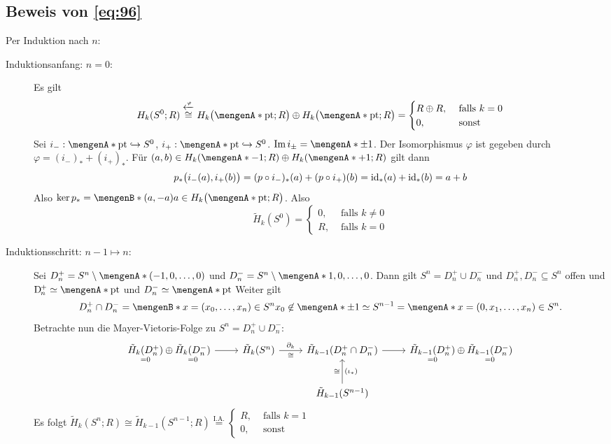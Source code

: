 \subsection[Beweis von \textbf{[\#\#]}]{Beweis von \eqref{eq:96}} %
\label{sub:97}
Per Induktion nach $n$:
\begin{description}
	\item[Induktionsanfang: $n=0$:] Es gilt
	\begin{align*}
		H_k(S^0;R) \stackrel{\xleftarrow{\varphi}}{\cong} H_k \enbrace[\big]{\set{\mathrm{pt}};R } \oplus H_k \enbrace[\big]{\set{\mathrm{pt}};R } = \begin{cases}
			R \oplus R, &\text{ falls }k=0\\
			0 ,&\text{ sonst}
		\end{cases}
	\end{align*} 
	Sei $i_- : \set{\mathrm{pt}} \hookrightarrow S^0$, $i_+ : \set{\mathrm{pt}} \hookrightarrow S^0$. $\im i_{\pm} = \set{\pm 1}$.
	Der Isomorphismus $\varphi$ ist gegeben durch $\varphi = (i_-)_* + (i_+)_*$. Für
	$(a,b) \in H_k \enbrace*{\set{-1};R}\oplus H_k \enbrace*{\set{+1};R}$ gilt dann
	\[
		p_* \enbrace[\big]{i_-(a), i_+(b)} = (p \circ i_-)_*(a) + (p \circ i_+)(b) = \id_*(a) + \id_*(b)= a+b
	\]
	Also $\ker p_* = \set[(a,-a)]{a \in H_k \enbrace[\big]{\set{\mathrm{pt}};R}}$. Also 
	\[
		\tilde{H}_k(S^0) = \begin{cases}
			0, &\text{ falls }k \not= 0\\
			R ,&\text{ falls }k=0
		\end{cases}
	\]
	\item[Induktionsschritt: $n-1  \mapsto n$:] Sei $D_n^+ = S^n \setminus \set{(-1,0,\ldots ,0)}$ und $D_n^- = S^n \setminus \set{1,0,\ldots ,0}$. Dann gilt
	$S^n = D_n^+ \cup D_n^-$ und $D_n^+, D_n^- \subseteq S^n$ offen und $\D_n^+ \simeq \set{\mathrm{pt}}$ und $D_n^- \simeq \set{\mathrm{pt}}$
	Weiter gilt 
	\[
		D_n^+ \cap D_n^- = \set[x=(x_0, \ldots , x_n) \in S^n]{x_0 \not\in \set{\pm 1}} \simeq S^{n-1} = \set{x=(0, x_1, \ldots , x_n) \in S^n}.
	\]
	Betrachte nun die Mayer-Vietoris-Folge zu $S^n = D_n^+ \cup D_n^-$: 
	\[
		\begin{tikzcd}
			\underset{=0}{\tilde{H}_k(D_n^+)} \oplus \underset{=0}{\tilde{H}_k(D_n^-)} \rar & 
			\tilde{H}_k(S^n) \rar["\partial_k", "\cong"'] &
			\tilde{H}_{k-1} \enbrace*{D_n^+ \cap D_n^-} \rar & 
			\underset{=0}{\tilde{H}_{k-1}(D_n^+)} \oplus \underset{=0}{\tilde{H}_{k-1}(D_n^-)} \\
			 & & \tilde{H}_{k-1}(S^{n-1}) \uar["\cong", "(\iota_*)"']& 
		\end{tikzcd}
	\]
	Es folgt $\tilde{H}_k(S^n;R) \cong \tilde{H}_{k-1}(S^{n-1};R) \stackrel{\text{I.A.}}{=} \begin{cases}
		R, &\text{ falls }k=1\\
		0, &\text{ sonst}
	\end{cases}$ \bewende
\end{description}
\newpage

